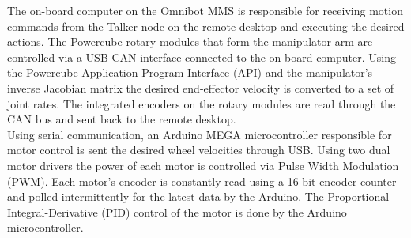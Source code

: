 \documentclass[onecolumn,10pt,final]{asme2ej}
\begin{document}


The on-board computer on the Omnibot MMS is responsible for receiving motion commands from the Talker node on the remote desktop and executing the desired actions. The Powercube rotary modules that form the manipulator arm are controlled via a USB-CAN interface connected to the on-board computer. Using the Powercube Application Program Interface (API) and the manipulator's inverse Jacobian matrix the desired end-effector velocity is converted to a set of joint rates. The integrated encoders on the rotary modules are read through the CAN bus and sent back to the remote desktop.\\

Using serial communication, an Arduino MEGA microcontroller responsible for motor control is sent the desired wheel velocities through USB. Using two dual motor drivers the power of each motor is controlled via Pulse Width Modulation (PWM). Each motor's encoder is constantly read using a 16-bit encoder counter and polled intermittently for the latest data by the Arduino. The Proportional-Integral-Derivative (PID) control of the motor is done by the Arduino microcontroller.\\
\end{document}
